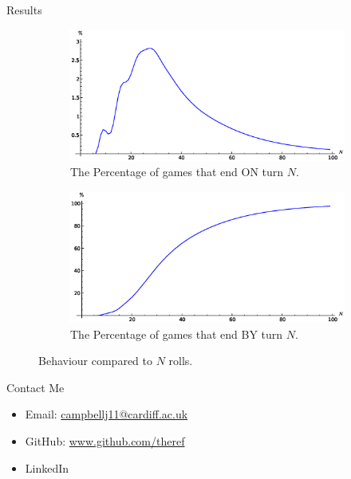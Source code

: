 \documentclass[14pt]{beamer}
\begin{document}
\begin{frame}{Results}
  \begin{figure}[!htbp]
    \centering
    \begin{subfigure}{.5\textwidth}
      \includegraphics[width=\linewidth]{images/turns}
      \caption{The Percentage of games that end ON turn $N$.}
    \end{subfigure}%
    \begin{subfigure}{.5\textwidth}
      \centering
      \includegraphics[width=\linewidth]{images/sumturns}
      \caption{The Percentage of games that end BY turn $N$.}
    \end{subfigure}
    \caption{Behaviour compared to $N$ rolls.}
  \end{figure}
\end{frame}

\begin{frame}{Contact Me}
  \begin{itemize}
    \itemsep2em
    \item Email: \href{mailto:campbellj11@cardiff.ac.uk}{campbellj11@cardiff.ac.uk}

    \item GitHub: \href{https://github.com/theref}{www.github.com/theref}

    \item LinkedIn
  \end{itemize}
\end{frame}
\end{document}
